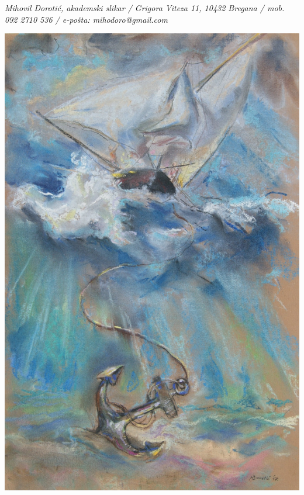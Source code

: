 \documentclass[a4paper,twoside, svgnames]{article}
\begin{document}
\begin{multicols}{2}
\begin{onehalfspacing}
\begin{justify}
\textit{Mihovil Dorotić, akademski slikar  
/ Grigora Viteza 11, 10432 Bregana
/ mob. 092 2710 536  
/ e-pošta: mihodoro@gmail.com}

\begin{center}
\includegraphics[width=\linewidth]{images/mihovil/a1_sidro}
\end{center}

\vfill


\end{justify}
\end{onehalfspacing}
\end{multicols}
\end{document}
